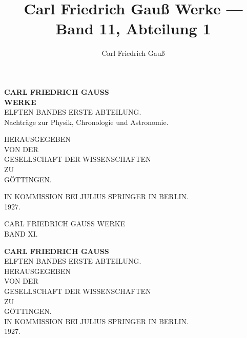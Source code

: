 \documentclass[12pt,a4paper]{article}
\title{Carl Friedrich Gau\ss{} Werke --- Band 11, Abteilung 1}
\author{Carl Friedrich Gau\ss{}}
\date{}
\theoremstyle{plain}
\theoremstyle{definition}
\theoremstyle{remark}
\begin{document}
\begin{titlepage}
\begin{center}
\vspace*{3cm}

{\Huge\bfseries CARL FRIEDRICH GAUSS\\[0.5cm]}
\vspace{1cm}
{\LARGE\bfseries WERKE\\[1cm]}
\vspace{1cm}
{\Large ELFTEN BANDES ERSTE ABTEILUNG.\\[0.5cm]}
\vspace{0.5cm}
{\large Nachtr\"age zur Physik, Chronologie und Astronomie.\\[2cm]}

\vfill

{\large HERAUSGEGEBEN\\[0.3cm]
VON DER\\[0.3cm]
GESELLSCHAFT DER WISSENSCHAFTEN\\[0.3cm]
ZU\\[0.3cm]
G\"OTTINGEN.\\[2cm]}

\vfill

{\large IN KOMMISSION BEI JULIUS SPRINGER IN BERLIN.\\[0.5cm]
1927.}

\end{center}
\end{titlepage}

\newpage
\thispagestyle{empty}
\begin{center}
\vspace*{5cm}
{\Large CARL FRIEDRICH GAUSS WERKE\\[1cm]}
{\large BAND XI.}
\end{center}
\newpage

\setcounter{page}{3}
\thispagestyle{empty}
\begin{center}
\vspace*{2cm}
{\Large\bfseries CARL FRIEDRICH GAUSS\\[0.5cm]}
\vspace{0.5cm}
{\large ELFTEN BANDES ERSTE ABTEILUNG.\\[1cm]}
\vspace{0.5cm}
{\normalsize HERAUSGEGEBEN\\[0.2cm]
VON DER\\[0.2cm]
GESELLSCHAFT DER WISSENSCHAFTEN\\[0.2cm]
ZU\\[0.2cm]
G\"OTTINGEN.\\[1cm]}
\vspace{0.5cm}
{\normalsize IN KOMMISSION BEI JULIUS SPRINGER IN BERLIN.\\[0.3cm]
1927.}
\end{center}
\end{document}
